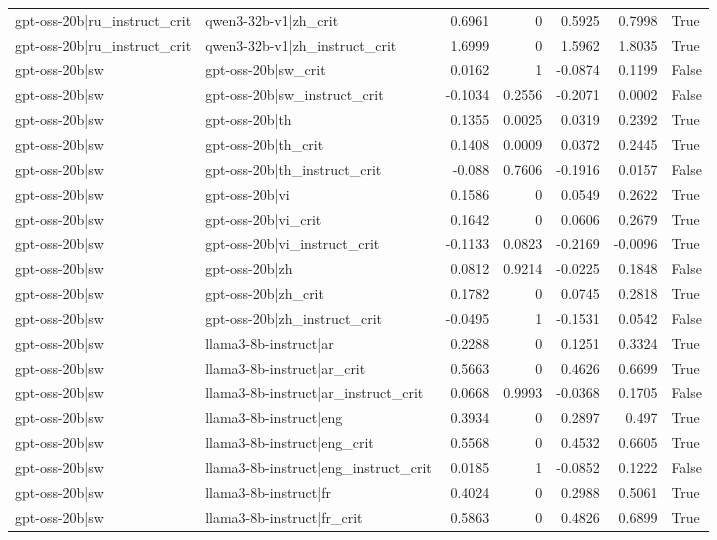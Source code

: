 \begin{table}
\begin{tabular}{l l r r r r l}
gpt-oss-20b|ru_instruct_crit & qwen3-32b-v1|zh_crit & 0.6961 & 0 & 0.5925 & 0.7998 & True \\
gpt-oss-20b|ru_instruct_crit & qwen3-32b-v1|zh_instruct_crit & 1.6999 & 0 & 1.5962 & 1.8035 & True \\
gpt-oss-20b|sw & gpt-oss-20b|sw_crit & 0.0162 & 1 & -0.0874 & 0.1199 & False \\
gpt-oss-20b|sw & gpt-oss-20b|sw_instruct_crit & -0.1034 & 0.2556 & -0.2071 & 0.0002 & False \\
gpt-oss-20b|sw & gpt-oss-20b|th & 0.1355 & 0.0025 & 0.0319 & 0.2392 & True \\
gpt-oss-20b|sw & gpt-oss-20b|th_crit & 0.1408 & 0.0009 & 0.0372 & 0.2445 & True \\
gpt-oss-20b|sw & gpt-oss-20b|th_instruct_crit & -0.088 & 0.7606 & -0.1916 & 0.0157 & False \\
gpt-oss-20b|sw & gpt-oss-20b|vi & 0.1586 & 0 & 0.0549 & 0.2622 & True \\
gpt-oss-20b|sw & gpt-oss-20b|vi_crit & 0.1642 & 0 & 0.0606 & 0.2679 & True \\
gpt-oss-20b|sw & gpt-oss-20b|vi_instruct_crit & -0.1133 & 0.0823 & -0.2169 & -0.0096 & True \\
gpt-oss-20b|sw & gpt-oss-20b|zh & 0.0812 & 0.9214 & -0.0225 & 0.1848 & False \\
gpt-oss-20b|sw & gpt-oss-20b|zh_crit & 0.1782 & 0 & 0.0745 & 0.2818 & True \\
gpt-oss-20b|sw & gpt-oss-20b|zh_instruct_crit & -0.0495 & 1 & -0.1531 & 0.0542 & False \\
gpt-oss-20b|sw & llama3-8b-instruct|ar & 0.2288 & 0 & 0.1251 & 0.3324 & True \\
gpt-oss-20b|sw & llama3-8b-instruct|ar_crit & 0.5663 & 0 & 0.4626 & 0.6699 & True \\
gpt-oss-20b|sw & llama3-8b-instruct|ar_instruct_crit & 0.0668 & 0.9993 & -0.0368 & 0.1705 & False \\
gpt-oss-20b|sw & llama3-8b-instruct|eng & 0.3934 & 0 & 0.2897 & 0.497 & True \\
gpt-oss-20b|sw & llama3-8b-instruct|eng_crit & 0.5568 & 0 & 0.4532 & 0.6605 & True \\
gpt-oss-20b|sw & llama3-8b-instruct|eng_instruct_crit & 0.0185 & 1 & -0.0852 & 0.1222 & False \\
gpt-oss-20b|sw & llama3-8b-instruct|fr & 0.4024 & 0 & 0.2988 & 0.5061 & True \\
gpt-oss-20b|sw & llama3-8b-instruct|fr_crit & 0.5863 & 0 & 0.4826 & 0.6899 & True \\

\end{tabular}
\end{table}
